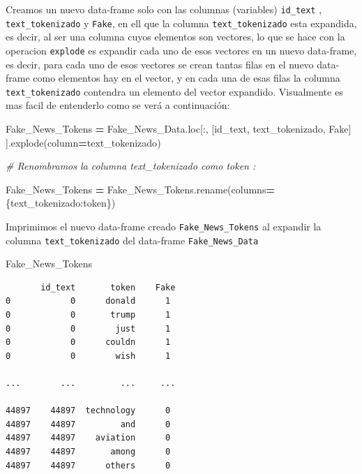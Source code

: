 \documentclass[
  11pt,
  a4paper,
]{article}
\newenvironment{Shaded}{\begin{snugshade}}{\end{snugshade}}
\newcommand{\CommentTok}[1]{\textcolor[rgb]{0.56,0.35,0.01}{\textit{#1}}}
\newcommand{\NormalTok}[1]{#1}
\newcommand{\OperatorTok}[1]{\textcolor[rgb]{0.81,0.36,0.00}{\textbf{#1}}}
\newcommand{\StringTok}[1]{\textcolor[rgb]{0.31,0.60,0.02}{#1}}
\begin{document}
Creamos un nuevo data-frame solo con las columnas (variables)
\texttt{id\_text} , \texttt{text\_tokenizado} y \texttt{Fake}, en ell
que la columna \texttt{text\_tokenizado} esta expandida, es decir, al
ser una columna cuyos elementos son vectores, lo que se hace con la
operacion \texttt{explode} es expandir cada uno de esos vectores en un
nuevo data-frame, es decir, para cada uno de esos vectores se crean
tantas filas en el nuevo data-frame como elementos hay en el vector, y
en cada una de esas filas la columna \texttt{text\_tokenizado} contendra
un elemento del vector expandido. Visualmente es mas facil de entenderlo
como se verá a continuación:

\begin{Shaded}
\begin{Highlighting}[]
\NormalTok{Fake\_News\_Tokens }\OperatorTok{=}\NormalTok{ Fake\_News\_Data.loc[:, [}\StringTok{\textquotesingle{}id\_text\textquotesingle{}}\NormalTok{, }\StringTok{\textquotesingle{}text\_tokenizado\textquotesingle{}}\NormalTok{, }\StringTok{\textquotesingle{}Fake\textquotesingle{}}\NormalTok{] ].explode(column}\OperatorTok{=}\StringTok{\textquotesingle{}text\_tokenizado\textquotesingle{}}\NormalTok{)}


\CommentTok{\# Renombramos la columna \textasciigrave{}text\_tokenizado\textasciigrave{} como \textasciigrave{}token\textasciigrave{} :}

\NormalTok{Fake\_News\_Tokens }\OperatorTok{=}\NormalTok{ Fake\_News\_Tokens.rename(columns}\OperatorTok{=}\NormalTok{\{}\StringTok{\textquotesingle{}text\_tokenizado\textquotesingle{}}\NormalTok{:}\StringTok{\textquotesingle{}token\textquotesingle{}}\NormalTok{\})}
\end{Highlighting}
\end{Shaded}

Imprimimos el nuevo data-frame creado \texttt{Fake\_News\_Tokens} al
expandir la columna \texttt{text\_tokenizado} del data-frame
\texttt{Fake\_News\_Data}

\begin{Shaded}
\begin{Highlighting}[]
\NormalTok{Fake\_News\_Tokens}
\end{Highlighting}
\end{Shaded}

\begin{verbatim}
       id_text       token    Fake
0            0      donald      1
0            0       trump      1
0            0        just      1
0            0      couldn      1
0            0        wish      1

...        ...         ...     ...

44897    44897  technology      0
44897    44897         and      0
44897    44897    aviation      0
44897    44897       among      0
44897    44897      others      0
\end{verbatim}
\end{document}
